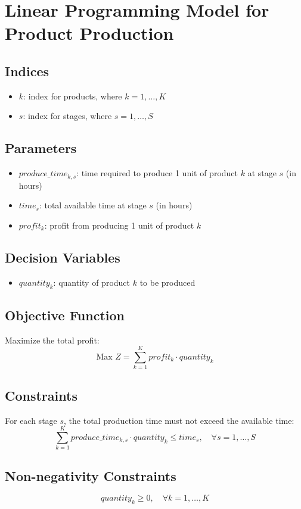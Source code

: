 \documentclass{article}
\begin{document}
\section*{Linear Programming Model for Product Production}

\subsection*{Indices}
\begin{itemize}
    \item $k$: index for products, where $k = 1, \ldots, K$
    \item $s$: index for stages, where $s = 1, \ldots, S$
\end{itemize}

\subsection*{Parameters}
\begin{itemize}
    \item $produce\_time_{k,s}$: time required to produce 1 unit of product $k$ at stage $s$ (in hours)
    \item $time_{s}$: total available time at stage $s$ (in hours)
    \item $profit_{k}$: profit from producing 1 unit of product $k$
\end{itemize}

\subsection*{Decision Variables}
\begin{itemize}
    \item $quantity_{k}$: quantity of product $k$ to be produced
\end{itemize}

\subsection*{Objective Function}
Maximize the total profit:
\[
\text{Max } Z = \sum_{k=1}^{K} profit_{k} \cdot quantity_{k}
\]

\subsection*{Constraints}
For each stage $s$, the total production time must not exceed the available time:
\[
\sum_{k=1}^{K} produce\_time_{k,s} \cdot quantity_{k} \leq time_{s}, \quad \forall s = 1, \ldots, S
\]

\subsection*{Non-negativity Constraints}
\[
quantity_{k} \geq 0, \quad \forall k = 1, \ldots, K
\]
\end{document}
